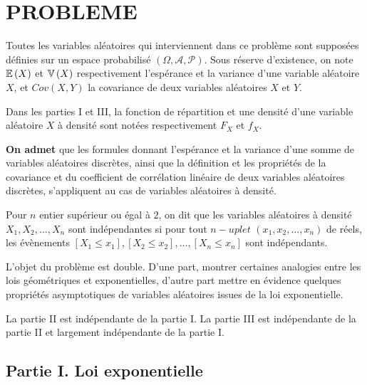 \documentclass[11pt]{article}%
\begin{document}
\newpage

\section*{PROBLEME}

Toutes les variables aléatoires qui interviennent dans ce problème
sont supposées définies sur un espace probabilisé $\left(
\Omega,\mathcal{A,P}\right) $. Sous réserve d'existence, on note
$\mathbb{E}\left(
X\right) $ et $\mathbb{V}\left( X\right) $ respectivement l'espérance et la
variance d'une variable aléatoire $X$, et $Cov\left( X,Y\right) $ la
covariance de deux variables aléatoires $X$ et $Y$.

Dans les parties I et III, la fonction de répartition et une densité
d'une variable aléatoire $X$ à densité sont notées
respectivement $F_{X}$ et $f_{X}$.

\textbf{On admet }que les formules donnant l'espérance et la variance
d'une somme de variables aléatoires discrètes, ainsi que la définition
et les propriétés de la covariance et du coefficient de corrélation
linéaire de deux variables aléatoires discrètes,
s'appliquent au cas de variables aléatoires à densité.

Pour $n$ entier supérieur ou égal à $2$, on dit que les
variables aléatoires à densité $X_{1},X_{2},...,X_{n}$ sont
indépendantes si pour tout $n-uplet$ $\left(
x_{1},x_{2},...,x_{n}\right) $
de réels, les évènements $\left[ X_{1}\leq x_{1}\right],\left[
X_{2}\leq x_{2}\right],...,\left[ X_{n}\leq x_{n}\right] $ sont
indépendants.

L'objet du problème est double. D'une part, montrer certaines analogies
entre les lois géométriques et exponentielles, d'autre part mettre
en évidence quelques propriétés asymptotiques de variables aléatoires
issues de la loi exponentielle.

La partie II est indépendante de la partie I. La partie III est
indépendante de la partie II et largement indépendante de la partie I.

\subsection*{Partie I. Loi exponentielle}
\end{document}
